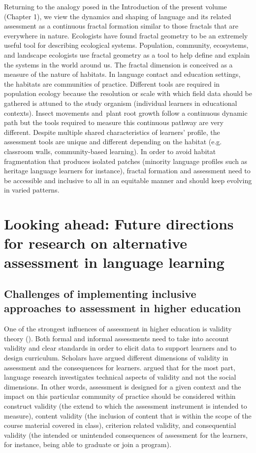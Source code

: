 \documentclass[output=paper]{langscibook}
\begin{document}
Returning to the analogy posed in the Introduction of the present volume (Chapter 1), we view the dynamics and shaping of language and its related assessment as a continuous fractal formation similar to those fractals that are everywhere in nature. Ecologists have found fractal geometry to be an extremely useful tool for describing ecological systems. Population, community, ecosystems, and landscape ecologists use fractal geometry as a tool to help define and explain the systems in the world around us. The fractal dimension is conceived as a measure of the nature of habitats. In language contact and education settings, the habitats are communities of practice. Different tools are required in population ecology because the resolution or scale with which field data should be gathered is attuned to the study organism (individual learners in educational contexts). Insect movements and~plant root growth follow a continuous dynamic path but the tools required to measure this continuous pathway are very different. Despite multiple shared characteristics of learners' profile, the assessment tools are unique and different depending on the habitat (e.g. classroom walls, community-based learning). In order to avoid habitat fragmentation that produces isolated patches (minority language profiles such as heritage language learners for instance), fractal formation and assessment need to be accessible and inclusive to all in an equitable manner and should keep evolving in varied patterns.

\section{Looking ahead: Future directions for research on alternative assessment in language learning}

\subsection{Challenges of implementing inclusive approaches to assessment in higher education}

One of the strongest influences of assessment in higher education is validity theory (\citealt{PhakitiIsaacs2021,BrownTrace2017}). Both formal and informal assessments need to take into account validity and clear standards in order to elicit data to support learners and to design curriculum. Scholars have argued different dimensions of validity in assessment and the consequences for learners. \citet{McNamaraRoever2006} argued that for the most part, language research investigates technical aspects of validity and not the social dimensions. In other words, assessment is designed for a given context and the impact on this particular community of practice should be considered within construct validity (the extend to which the assessment instrument is intended to measure), content validity (the inclusion of content that is within the scope of the course material covered in class), criterion related validity, and consequential validity (the intended or unintended consequences of assessment for the learners, for instance, being able to graduate or join a program).
\end{document}
